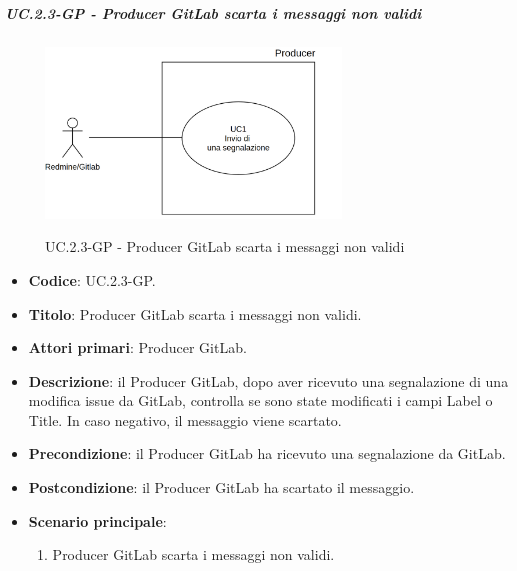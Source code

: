 		\subparagraph{UC\theuccount.2.3-GP - Producer GitLab scarta i messaggi non validi}
		\begin{figure}[H]
			\centering
			\includegraphics[width=0.7\textwidth]{img/UC1.png}\\
			\caption{UC\theuccount.2.3-GP - Producer GitLab scarta i messaggi non validi}
		\end{figure}
		\begin{itemize}
			\item \textbf{Codice}: UC\theuccount.2.3-GP.
			\item \textbf{Titolo}: Producer GitLab scarta i messaggi non validi.
			\item \textbf{Attori primari}: Producer GitLab.
			\item \textbf{Descrizione}: il Producer GitLab, dopo aver ricevuto una segnalazione di una modifica issue da GitLab, controlla
			se sono state modificati i campi Label o Title. In caso negativo, il messaggio viene scartato.
			\item \textbf{Precondizione}: il Producer GitLab ha ricevuto una segnalazione da GitLab.
			\item \textbf{Postcondizione}: il Producer GitLab ha scartato il messaggio.
			\item \textbf{Scenario principale}: 
			\begin{enumerate}
				\item Producer GitLab scarta i messaggi non validi.
			\end{enumerate}
		\end{itemize}